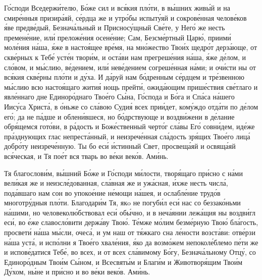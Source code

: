 \begin{mymulticols}

Г\'{о}споди Вседерж\'{и}телю, Б\'{о}же сил и вс\'{я}кия пл\'{о}ти, в в\'{ы}шних жив\'{ы}й и на смир\'{е}нныя призир\'{а}яй, с\'{е}рдца же и утр\'{о}бы испыт\'{у}яй и сокров\'{е}нная челов\'{е}ков \'{я}ве предв\'{е}дый, Безнач\'{а}льный и Приснос\'{у}щный Св\'{е}те, у Нег\'{о} же несть премен\'{е}ние, ил\'{и} прелож\'{е}ния осен\'{е}ние; Сам, Безсм\'{е}ртный Цар\'{ю}, приим\'{и} мол\'{е}ния н\'{а}ша, \'{я}же в насто\'{я}щее вр\'{е}мя, на мн\'{о}жество Тво\'{и}х щедр\'{о}т дерз\'{а}юще, от скв\'{е}рных к Теб\'{е} уст\'{е}н твор\'{и}м, и ост\'{а}ви нам прегреш\'{е}ния н\'{а}ша, \'{я}же д\'{е}лом, и сл\'{о}вом, и м\'{ы}слию, в\'{е}дением, ил\'{и} нев\'{е}дением согреш\'{е}нная н\'{а}ми; и оч\'{и}сти ны от вс\'{я}кия скв\'{е}рны пл\'{о}ти и д\'{у}ха. И д\'{а}руй нам б\'{о}дренным с\'{е}рдцем и тр\'{е}звенною м\'{ы}слию всю насто\'{я}щаго жити\'{я} нощь прейт\'{и}, ожид\'{а}ющим приш\'{е}ствия св\'{е}тлаго и явл\'{е}ннаго дне Единор\'{о}днаго Тво\'{е}го С\'{ы}на, Г\'{о}спода и Б\'{о}га и Сп\'{а}са н\'{а}шего Иис\'{у}са Христ\'{а}, в \'{о}ньже со сл\'{а}вою Суди\'{я} всех при\'{и}дет, ком\'{у}ждо отд\'{а}ти по д\'{е}лом ег\'{о}; да не п\'{а}дше и облен\'{и}вшеся, но б\'{о}дрствующе и воздв\'{и}жени в д\'{е}лание обр\'{я}щемся гот\'{о}ви, в р\'{а}дость и Бож\'{е}ственный черт\'{о}г сл\'{а}вы Ег\'{о} совн\'{и}дем, ид\'{е}же пр\'{а}зднующих глас непрест\'{а}нный, и неизреч\'{е}нная сл\'{а}дость зр\'{я}щих Тво\'{е}го лиц\'{а} добр\'{о}ту неизреч\'{е}нную. Ты бо ес\'{и} \'{и}стинный Свет, просвещ\'{а}яй и освящ\'{а}яй вс\'{я}ческая, и Тя по\'{е}т вся тварь во в\'{е}ки век\'{о}в. Ам\'{и}нь.


Тя благослов\'{и}м, в\'{ы}шний Б\'{о}же и Г\'{о}споди м\'{и}лости, твор\'{я}щаго пр\'{и}сно с н\'{а}ми вел\'{и}кая же и неизсл\'{е}дованная, сл\'{а}вная же и уж\'{а}сная, \'{и}хже несть числ\'{а}, под\'{а}вшаго нам сон во упоко\'{е}ние н\'{е}мощи н\'{а}шея, и ослабл\'{е}ние труд\'{о}в многотр\'{у}дныя пл\'{о}ти. Благодар\'{и}м Тя, якo не погуб\'{и}л ес\'{и} нас со беззак\'{о}ньми н\'{а}шими, но человекол\'{ю}бствовал ес\'{и} об\'{ы}чно, и в неч\'{а}янии леж\'{а}щия ны воздв\'{и}гл ес\'{и}, во \'{е}же славосл\'{о}вити держ\'{а}ву Тво\'{ю}. Т\'{е}мже м\'{о}лим безм\'{е}рную Тво\'{ю} бл\'{а}гость, просвет\'{и} н\'{а}ша м\'{ы}сли, очес\'{а}, и ум наш от т\'{я}жкаго сна л\'{е}ности возст\'{а}ви: отв\'{е}рзи н\'{а}ша уст\'{а}, и исп\'{о}лни я Тво\'{е}го хвал\'{е}ния, \'{я}ко да возм\'{о}жем непокол\'{е}блемо п\'{е}ти же и испов\'{е}датися Теб\'{е}, во всех, и от всех сл\'{а}вимому Б\'{о}гу, Безнач\'{а}льному Отц\'{у}, со Единор\'{о}дным Тво\'{и}м С\'{ы}ном, и Всесвят\'{ы}м и Благ\'{и}м и Животвор\'{я}щим Тво\'{и}м Д\'{у}хом, н\'{ы}не и пр\'{и}сно и во в\'{е}ки век\'{о}в. Ам\'{и}нь.


\end{mymulticols}
